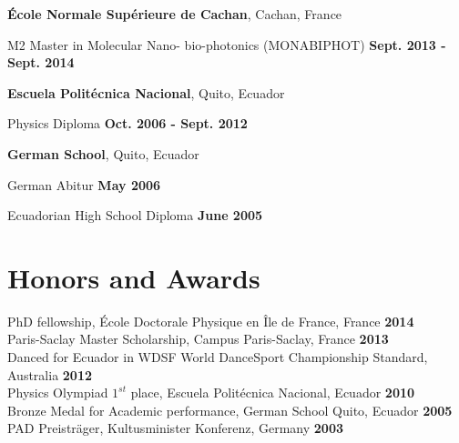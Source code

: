 \documentclass[margin,line]{res}
\newenvironment{list1}{
  \begin{list}{\ding{113}}{%
      \setlength{\itemsep}{0in}
      \setlength{\parsep}{0in} \setlength{\parskip}{0in}
      \setlength{\topsep}{0in} \setlength{\partopsep}{0in}
      \setlength{\leftmargin}{0.17in}}}{\end{list}}
\newenvironment{list2}{
  \begin{list}{$\bullet$}{%
      \setlength{\itemsep}{0in}
      \setlength{\parsep}{0in} \setlength{\parskip}{0in}
      \setlength{\topsep}{0in} \setlength{\partopsep}{0in}
      \setlength{\leftmargin}{0.2in}}}{\end{list}}
\begin{document}
\begin{resume}
{\bf École Normale Supérieure de Cachan}, Cachan, France\\
  \vspace{-.1in}
  \begin{list1}
    \item[] M2 Master in Molecular Nano- bio-photonics (MONABIPHOT) \hfill
{\bf Sept. 2013 - Sept. 2014}
  \end{list1}

  {\bf Escuela Politécnica Nacional}, Quito, Ecuador\\
  \vspace{-.1in}
  \begin{list1}
    \item[] Physics Diploma \hfill {\bf Oct. 2006 - Sept. 2012}\\
  \end{list1}

  {\bf German School}, Quito, Ecuador\\
  \vspace{-.1in}
  \begin{list1}
    \item[] German Abitur \hfill {\bf May 2006}
    \item[] Ecuadorian High School Diploma \hfill {\bf June 2005}
  \end{list1}

\section{\sc Honors and Awards}
PhD fellowship, École Doctorale Physique en Île de France, France \hfill {\bf
2014}\\
  Paris-Saclay Master Scholarship, Campus Paris-Saclay, France \hfill {\bf
2013}\\
  Danced for Ecuador in WDSF World DanceSport Championship Standard, Australia \hfill {\bf 2012}\\
  Physics Olympiad $1^{st}$ place, Escuela Politécnica Nacional, Ecuador \hfill {\bf 2010}\\
  Bronze Medal for Academic performance, German School Quito, Ecuador \hfill {\bf 2005}\\
  PAD Preisträger, Kultusminister Konferenz, Germany \hfill {\bf 2003}


\end{resume}
\end{document}
